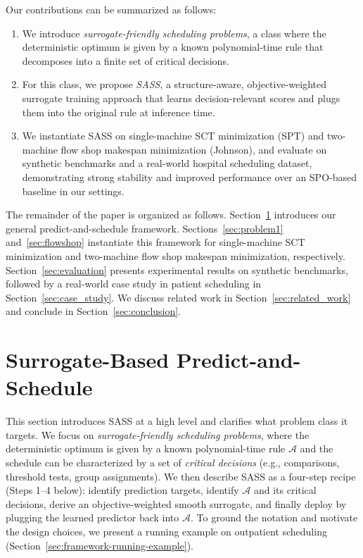 \documentclass{article}
\begin{document}
Our contributions can be summarized as follows:
\begin{enumerate}
    \item We introduce \emph{surrogate-friendly scheduling problems}, a class where the deterministic optimum is given by a known polynomial-time rule that decomposes into a finite set of critical decisions.
    \item For this class, we propose \emph{SASS}, a structure-aware, objective-weighted surrogate training approach that learns decision-relevant scores and plugs them into the original rule at inference time.
    \item We instantiate SASS on single-machine SCT minimization (SPT) and two-machine flow shop makespan minimization (Johnson), and evaluate on synthetic benchmarks and a real-world hospital scheduling dataset, demonstrating strong stability and improved performance over an SPO-based baseline in our settings.
\end{enumerate} The remainder of the paper is organized as follows.
Section~\ref{sec:framework} introduces our general predict-and-schedule framework.
Sections~\ref{sec:problem1} and~\ref{sec:flowshop} instantiate this framework for single-machine SCT minimization and two-machine flow shop makespan minimization, respectively.
Section~\ref{sec:evaluation} presents experimental results on synthetic benchmarks, followed by a real-world case study in patient scheduling in Section~\ref{sec:case_study}.
We discuss related work in Section~\ref{sec:related_work} and conclude in Section~\ref{sec:conclusion}.

\section{Surrogate-Based Predict-and-Schedule}
\label{sec:framework}

This section introduces SASS at a high level and clarifies what problem class it targets.
We focus on \emph{surrogate-friendly scheduling problems}, where the deterministic optimum is given by a known polynomial-time rule $\mathcal{A}$ and the schedule can be characterized by a set of \emph{critical decisions} (e.g., comparisons, threshold tests, group assignments).
We then describe SASS as a four-step recipe (Steps 1--4 below): identify prediction targets, identify $\mathcal{A}$ and its critical decisions, derive an objective-weighted smooth surrogate, and finally deploy by plugging the learned predictor back into $\mathcal{A}$.
To ground the notation and motivate the design choices, we present a running example on outpatient scheduling (Section~\ref{sec:framework-running-example}).
\end{document}

